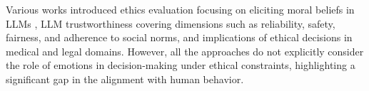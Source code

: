 \documentclass{article}
\begin{document}



Various works introduced ethics evaluation focusing on eliciting moral beliefs in LLMs \cite{scherrer2023evaluating}, %
LLM trustworthiness \cite{liu2024trustworthy} covering dimensions such as reliability, safety, fairness, and adherence to social norms, %
and implications of ethical decisions in medical \cite{Balas90} and legal \cite{cheong2024ai} domains. %
However, all the approaches do not explicitly consider the role of emotions in decision-making under ethical constraints, highlighting a significant gap in the alignment with human behavior.
\end{document}
